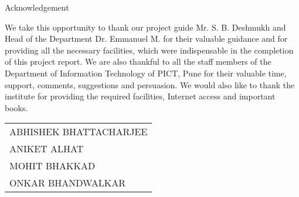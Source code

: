 \thispagestyle{plain} 
\centerline{\Huge Acknowledgement}\vspace*{25mm} 

We take this opportunity to thank our project guide Mr. S. B. Deshmukh and Head of the Department Dr. Emmanuel M. for their valuable guidance and for providing all the necessary facilities, which were indispensable in the completion of this project report. We are also thankful to all the staff members of the Department of Information Technology of PICT, Pune for their valuable time, support, comments, suggestions and persuasion. We would also like to thank the institute for providing the required facilities, Internet access and important books. 
\vspace*{20mm} 

\begin{flushright}
\begin{tabular}{l} 
ABHISHEK BHATTACHARJEE\\
ANIKET ALHAT\\
MOHIT BHAKKAD\\
ONKAR BHANDWALKAR\\
\end{tabular} 
\end{flushright}\vspace*{5mm}


